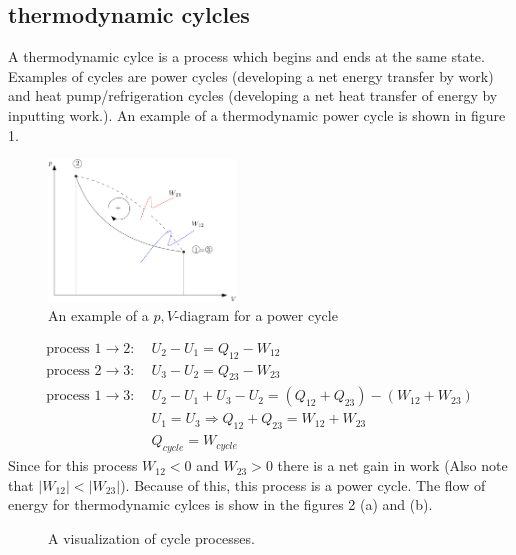 \documentclass[11pt, a4paper]{article}
\begin{document}
\subsection{thermodynamic cylcles}
A thermodynamic cylce is a process which begins and ends at the same state. Examples of cycles are power cycles (developing a net energy transfer by work) and heat pump/refrigeration cycles (developing a net heat transfer of energy by inputting work.). An example of a thermodynamic power cycle is shown in figure 1.
\begin{figure}[h]
  \centerline{\includegraphics[width=50mm]{images/Power_Cycle.png}}
  \caption{An example of a $p,V$-diagram for a power cycle}
\end{figure}
\begin{align}
  \text{process } 1 \to 2:\; &U_2 - U_1 = Q_{12} - W_{12}\\
  \text{process } 2 \to 3:\; &U_3 - U_2 = Q_{23} - W_{23}\\
  \text{process } 1 \to 3:\; &U_2 - U_1 + U_3 - U_2 = (Q_{12} + Q_{23}) - (W_{12} + W_{23})\\
                             &U_1 = U_3 \Rightarrow Q_{12} + Q_{23} = W_{12} + W_{23}\\
                             &Q_{cycle} = W_{cycle}
\end{align}
Since for this process $W_{12} < 0$ and $W_{23} > 0$ there is a net gain in work (Also note that $|W_{12}| < |W_{23}|$). Because of this, this process is a power cycle.
The flow of energy for thermodynamic cylces is show in the figures 2 (a) and (b).
\begin{figure}[h]
  \centering
  \qquad
  \caption{A visualization of cycle processes.}
\end{figure}
\end{document}
